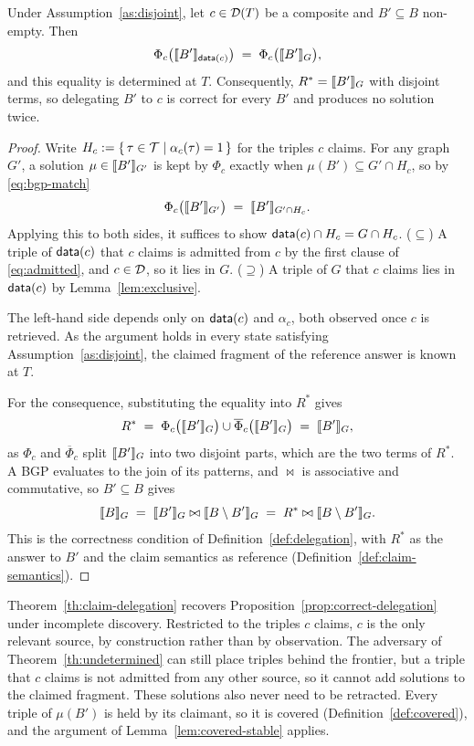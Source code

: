 \begin{theorem}
\label{th:claim-delegation}
Under Assumption~\ref{as:disjoint}, let $c \in \mathcal{D}(T)$ be a composite and $B' \subseteq B$
non-empty. Then
\[
  \Phi_c\bigl(\llbracket B' \rrbracket_{\mathsf{data}(c)}\bigr) \;=\; \Phi_c\bigl(\llbracket B' \rrbracket_{G}\bigr),
\]
and this equality is determined at $T$. Consequently, $R^{*} = \llbracket B' \rrbracket_{G}$ with disjoint
terms, so delegating $B'$ to $c$ is correct for every $B'$ and produces no solution twice.
\end{theorem}

\begin{proof}
  Write $H_c := \{\, \tau \in \mathcal{T} \mid \alpha_c(\tau) = 1 \,\}$ for the triples $c$ claims.
  For any graph $G'$, a solution $\mu \in \llbracket B' \rrbracket_{G'}$ is kept by $\Phi_c$ exactly when
  $\mu(B') \subseteq G' \cap H_c$, so by \eqref{eq:bgp-match}
  \[
    \Phi_c\bigl(\llbracket B' \rrbracket_{G'}\bigr) \;=\; \llbracket B' \rrbracket_{G' \cap H_c}.
  \]
  Applying this to both sides, it suffices to show $\mathsf{data}(c) \cap H_c = G \cap H_c$.
  ($\subseteq$) A triple of $\mathsf{data}(c)$ that $c$ claims is admitted from $c$ by the first
  clause of \eqref{eq:admitted}, and $c \in \mathcal{D}$, so it lies in $G$. ($\supseteq$) A triple
  of $G$ that $c$ claims lies in $\mathsf{data}(c)$ by Lemma~\ref{lem:exclusive}.

  The left-hand side depends only on $\mathsf{data}(c)$ and $\alpha_c$, both observed once $c$ is
  retrieved. As the argument holds in every state satisfying
  Assumption~\ref{as:disjoint}, the claimed fragment of the reference answer is known
  at $T$.

  For the consequence, substituting the equality into $R^{*}$ gives
  \[
    R^{*} \;=\; \Phi_c\bigl(\llbracket B' \rrbracket_{G}\bigr) \cup \overline{\Phi}_c\bigl(\llbracket B' \rrbracket_{G}\bigr)
    \;=\; \llbracket B' \rrbracket_{G},
  \]
  as $\Phi_c$ and $\overline{\Phi}_c$ split $\llbracket B' \rrbracket_{G}$ into two disjoint parts, which are
  the two terms of $R^{*}$. A BGP evaluates to the join of its patterns, and $\bowtie$ is
  associative and commutative, so $B' \subseteq B$ gives
  \[
    \llbracket B \rrbracket_{G} \;=\; \llbracket B' \rrbracket_{G} \bowtie \llbracket B \setminus B' \rrbracket_{G}
    \;=\; R^{*} \bowtie \llbracket B \setminus B' \rrbracket_{G}.
  \]
  This is the correctness condition of Definition~\ref{def:delegation}, with $R^{*}$ as
  the answer to $B'$ and the claim semantics as reference
  (Definition~\ref{def:claim-semantics}).
\end{proof}

Theorem~\ref{th:claim-delegation} recovers Proposition~\ref{prop:correct-delegation} under
incomplete discovery. Restricted to the triples $c$ claims, $c$ is the only relevant
source, by construction rather than by observation. The adversary of
Theorem~\ref{th:undetermined} can still place triples behind the frontier, but a triple
that $c$ claims is not admitted from any other source, so it cannot add solutions to the
claimed fragment. These solutions also never need to be retracted. Every triple of
$\mu(B')$ is held by its claimant, so it is covered (Definition~\ref{def:covered}), and
the argument of Lemma~\ref{lem:covered-stable} applies.


